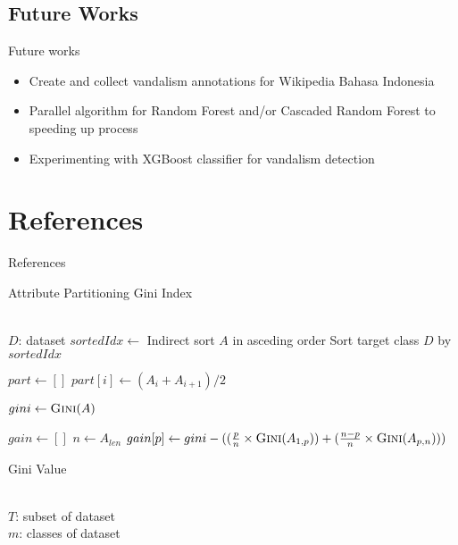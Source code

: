 \documentclass{beamer}
\begin{document}
\subsection{Future Works}
\begin{frame}
	{Future works}
	\begin{itemize}
		\item Create and collect vandalism annotations for Wikipedia Bahasa
		Indonesia
		\item Parallel algorithm for Random Forest and/or Cascaded Random
		Forest to speeding up process
		\item Experimenting with XGBoost classifier for vandalism detection
	\end{itemize}
\end{frame}

\section*{References}

\begin{frame}{References}
\printbibliography
\end{frame}

\begin{frame}
	{Attribute Partitioning}
	{Gini Index}
	\small
	\begin{algorithmic}[1]
		\Require \\
		$ D $: dataset
				\State $ sortedIdx \gets $ Indirect sort $A$ in asceding
				order
				\State Sort target class $D$ by $ sortedIdx $

				\State $ part \gets [ ] $
					\State $ part[i] \gets (A_{i} + A_{i+1}) / 2 $
				\EndFor

				\State $ gini \gets \Call{Gini}{A} $

				\State $ gain \gets [ ] $
				\State $ n \gets A_{len} $
					\State $ gain[p] \gets gini - (
						(\frac{p}{n} \times \Call{Gini}{A_{1,p}})
						+
						(\frac{n - p}{n} \times \Call{Gini}{A_{p,n}})
						)
						$
				\EndFor
			\EndFor
		\EndFunction
	\end{algorithmic}
\end{frame}

\begin{frame}
	{Gini Value}
	\begin{algorithmic}[1]
		\Require \\
		$ T $: subset of dataset \\
		$ m $: classes of dataset
			\State {}
		\EndFunction
	\end{algorithmic}
\end{frame}
\end{document}
